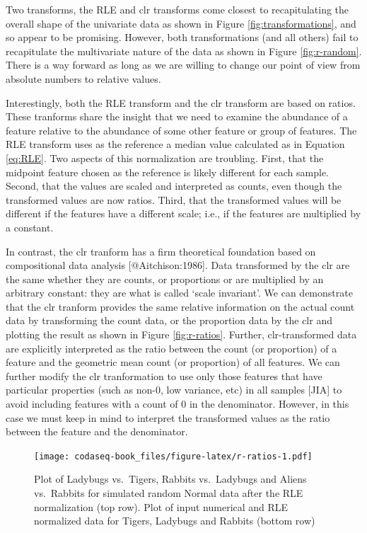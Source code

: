 \documentclass[
  onecolumn]{article}
\begin{document}
Two transforms, the RLE and clr transforms come closest to recapitulating the overall shape of the univariate data as shown in Figure \ref{fig:transformations}, and so appear to be promising. However, both transformations (and all others) fail to recapitulate the multivariate nature of the data as shown in Figure \ref{fig:r-random}. There is a way forward as long as we are willing to change our point of view from absolute numbers to relative values.

Interestingly, both the RLE transform and the clr transform are based on ratios. These tranforms share the insight that we need to examine the abundance of a feature relative to the abundance of some other feature or group of features. The RLE transform uses as the reference a median value calculated as in Equation \ref{eq:RLE}. Two aspects of this normalization are troubling. First, that the midpoint feature chosen as the reference is likely different for each sample. Second, that the values are scaled and interpreted as counts, even though the transformed values are now ratios. Third, that the transformed values will be different if the features have a different scale; i.e., if the features are multiplied by a constant.

In contrast, the clr tranform has a firm theoretical foundation based on compositional data analysis {[}@Aitchison:1986{]}. Data transformed by the clr are the same whether they are counts, or proportions or are multiplied by an arbitrary constant: they are what is called `scale invariant'. We can demonstrate that the clr tranform provides the same relative information on the actual count data by transforming the count data, or the proportion data by the clr and plotting the result as shown in Figure \ref{fig:r-ratios}. Further, clr-transformed data are explicitly interpreted as the ratio between the count (or proportion) of a feature and the geometric mean count (or proportion) of all features. We can further modify the clr tranformation to use only those features that have particular properties (such as non-0, low variance, etc) in all samples {[}JIA{]} to avoid including features with a count of 0 in the denominator. However, in this case we must keep in mind to interpret the transformed values as the ratio between the feature and the denominator.

\begin{figure}
\centering
\texttt{[image: codaseq-book\_files/figure-latex/r-ratios-1.pdf]}
\caption{\label{fig:r-ratios}\label{R_random} Plot of Ladybugs vs.~Tigers, Rabbits vs.~Ladybugs and Aliens vs.~Rabbits for simulated random Normal data after the RLE normalization (top row). Plot of input numerical and RLE normalized data for Tigers, Ladybugs and Rabbits (bottom row)}
\end{figure}
\end{document}
